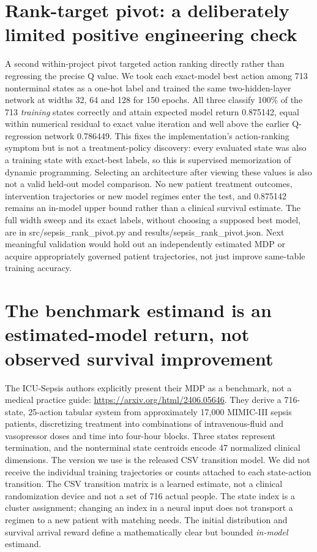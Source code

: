 \section{Rank-target pivot: a deliberately limited positive engineering check}
A second within-project pivot targeted action ranking directly rather than regressing the precise Q value. We took each exact-model best action among 713 nonterminal states as a one-hot label and trained the same two-hidden-layer network at widths 32, 64 and 128 for 150 epochs. All three classify 100\% of the 713 \emph{training} states correctly and attain expected model return 0.875142, equal within numerical residual to exact value iteration and well above the earlier Q-regression network 0.786449. This fixes the implementation's action-ranking symptom but is not a treatment-policy discovery: every evaluated state was also a training state with exact-best labels, so this is supervised memorization of dynamic programming. Selecting an architecture after viewing these values is also not a valid held-out model comparison. No new patient treatment outcomes, intervention trajectories or new model regimes enter the test, and 0.875142 remains an in-model upper bound rather than a clinical survival estimate. The full width sweep and its exact labels, without choosing a supposed best model, are in src/sepsis\_rank\_pivot.py and results/sepsis\_rank\_pivot.json. Next meaningful validation would hold out an independently estimated MDP or acquire appropriately governed patient trajectories, not just improve same-table training accuracy.

\section{The benchmark estimand is an estimated-model return, not observed survival improvement}
The ICU-Sepsis authors explicitly present their MDP as a benchmark, not a medical practice guide: \url{https://arxiv.org/html/2406.05646}. They derive a 716-state, 25-action tabular system from approximately 17,000 MIMIC-III sepsis patients, discretizing treatment into combinations of intravenous-fluid and vasopressor doses and time into four-hour blocks. Three states represent termination, and the nonterminal state centroids encode 47 normalized clinical dimensions. The version we use is the released CSV transition model. We did not receive the individual training trajectories or counts attached to each state-action transition. The CSV transition matrix is a learned estimate, not a clinical randomization device and not a set of 716 actual people. The state index is a cluster assignment; changing an index in a neural input does not transport a regimen to a new patient with matching needs. The initial distribution and survival arrival reward define a mathematically clear but bounded \emph{in-model} estimand.

